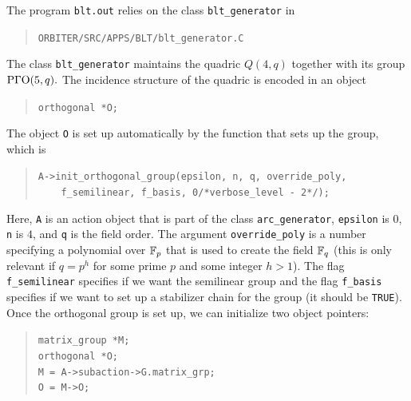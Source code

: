 The program \verb'blt.out' relies on the class \verb'blt_generator' in 
\begin{quote}
\verb'ORBITER/SRC/APPS/BLT/blt_generator.C'
\end{quote}
The class \verb'blt_generator' maintains the quadric $Q(4,q)$ 
together with its group ${\rm P}\Gamma{\rm O}(5,q).$
The incidence structure of the quadric is encoded in an object 
\begin{quote}
\verb'orthogonal *O;'
\end{quote}
The object \verb'O' is set up automatically by the function that sets up the group, 
which is
\begin{quote} 
\verb'A->init_orthogonal_group(epsilon, n, q, override_poly,' \\
\verb'    f_semilinear, f_basis, 0/*verbose_level - 2*/);'\\
\end{quote}
Here, \verb'A' is an action object that is part of the class \verb'arc_generator', 
\verb'epsilon' is $0$, \verb'n' is $4$, and \verb'q' is the field order. 
The argument \verb'override_poly' is a number 
specifying a polynomial over ${\mathbb F}_p$ that 
is used to create the field ${\mathbb F}_q$ 
(this is only relevant if $q=p^h$ for some prime $p$ 
and some integer $h > 1$).
The flag \verb'f_semilinear' specifies if we want the semilinear group 
and the flag \verb'f_basis' specifies if we want to set up a stabilizer chain 
for the group (it should be \verb'TRUE').
Once the orthogonal group is set up, we can initialize two object pointers:
\begin{quote}
\verb'matrix_group *M;'\\
\verb'orthogonal *O;'\\
\verb'M = A->subaction->G.matrix_grp;'\\
\verb'O = M->O;'\\
\end{quote}

\bigskip


